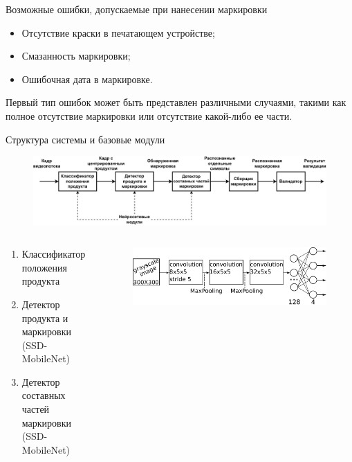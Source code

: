 \documentclass[10pt]{beamer}
\begin{document}
        \begin{frame}{Возможные ошибки, допускаемые при нанесении маркировки}
            \begin{itemize}
                \item Отсутствие краски в печатающем устройстве;
                \item Смазанность маркировки;
                \item Ошибочная дата в маркировке.
            \end{itemize}

            Первый тип ошибок может быть представлен различными случаями, такими как полное отсутствие маркировки или отсутствие какой-либо ее части.
        \end{frame}

        \begin{frame}{Структура системы и базовые модули}
            \begin{figure}[H]
                \centering
                \includegraphics[width=\textwidth]{savushkin_structure.png}
            \end{figure}
            \begin{columns}
                \begin{column}{0.4\textwidth}
                    \begin{enumerate}
                        \item Классификатор положения продукта
                        \item Детектор продукта и маркировки (SSD-MobileNet)
                        \item Детектор составных частей маркировки (SSD-MobileNet)
                    \end{enumerate}
                \end{column}
                \begin{column}{0.6\textwidth}
                    \begin{figure}
                        \centering
                        \includegraphics[width=\textwidth]{pic4-4.pdf}

\end{figure}
\end{column}
\end{columns}
\end{frame}
\end{document}
